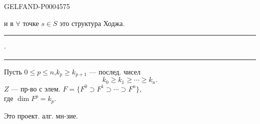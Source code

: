 \begin{GelfandAdjacentEvidence}{GELFAND-P000457}{5}

и в $\forall$ точке $s\in S$ это структура Ходжа.

\begin{center}
\rule[.5ex]{15mm}{.35pt}\enspace$\cdot$\enspace\rule[.5ex]{22mm}{.35pt}
\end{center}

Пусть $0\le p\le n$,\quad $k_p\ge k_{p+1}$ — послед. чисел
\[
k_0\ge k_1\ge\cdots\ge k_n.
\]
$Z$ — пр-во с элем. $F=\{F^0\supset F^1\supset\cdots\supset F^n\}$,\\
где $\dim F^p=k_p$.
\end{GelfandAdjacentEvidence}


Это проект. алг. мн-зие.


